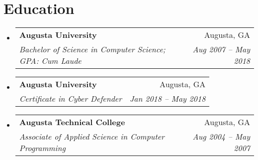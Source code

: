 \documentclass[letterpaper,11pt]{article}
\makeatletter
\newcommand{\resumeSubheading}[4]{
  \vspace{-1pt}\item
    \begin{tabular*}{0.97\textwidth}{l@{\extracolsep{\fill}}r}
      \textbf{#1} & #2 \\
      \textit{\small#3} & \textit{\small #4} \\
    \end{tabular*}\vspace{-5pt}
}
\newcommand{\resumeSubHeadingListStart}{\begin{itemize}[leftmargin=*]}
\newcommand{\resumeSubHeadingListEnd}{\end{itemize}}
\makeatother
\begin{document}

\section{Education}
  \resumeSubHeadingListStart
    \resumeSubheading
      {Augusta University}{Augusta, GA}
      {Bachelor of Science in Computer Science;  GPA: Cum Laude}{Aug 2007 -- May 2018}
    \resumeSubheading
      {Augusta University}{Augusta, GA}
      {Certificate in Cyber Defender}{Jan 2018 -- May 2018}
    \resumeSubheading
      {Augusta Technical College}{Augusta, GA}
      {Associate of Applied Science in Computer Programming}{Aug 2004 -- May 2007}
  \resumeSubHeadingListEnd
\end{document}
